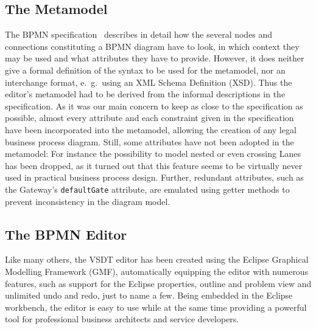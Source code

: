 \subsection{The Metamodel}
\label{sec:intro_vsdt_meta}

The BPMN specification~\cite{omg2009bpmn} describes in detail how the several nodes and connections constituting a BPMN diagram have to look, in which context they may be used and what attributes they have to provide.  However, it does neither give a formal definition of the syntax to be used for the metamodel, nor an interchange format, e.~g.\ using an XML Schema Definition (XSD).  Thus the editor's metamodel had to be derived from the informal descriptions in the specification.  As it was our main concern to keep as close to the specification as possible, almost every attribute and each constraint given in the specification have been incorporated into the metamodel, allowing the creation of any legal business process diagram.  Still, some attributes have not been adopted in the metamodel:  For instance the possibility to model nested or even crossing Lanes has been dropped, as it turned out that this feature seems to be virtually never used in practical business process design.  Further, redundant attributes, such as the Gateway's \texttt{defaultGate} attribute, are emulated using getter methods to prevent inconsistency in the diagram model.


\subsection{The BPMN Editor}
\label{sec:intro_vsdt_editor}


Like many others, the VSDT editor has been created using the Eclipse Graphical Modelling Framework (GMF), automatically equipping the editor with numerous features, such as support for the Eclipse properties, outline and problem view and unlimited undo and redo, just to name a few.  Being embedded in the Eclipse workbench, the editor is easy to use while at the same time providing a powerful tool for professional business architects and service developers.

